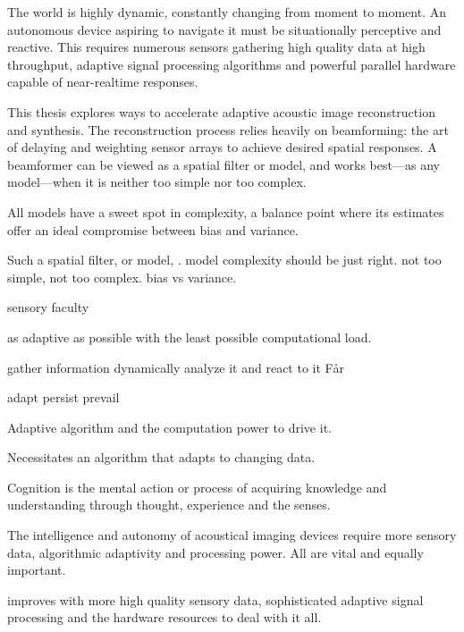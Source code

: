 
The world is highly dynamic, constantly changing from moment to moment. An autonomous device aspiring to navigate it must be situationally perceptive and reactive. This requires numerous sensors gathering high quality data at high throughput, adaptive signal processing algorithms and powerful parallel hardware capable of near-realtime responses.

This thesis explores ways to accelerate adaptive acoustic image reconstruction and synthesis. The reconstruction process relies heavily on beamforming: the art of delaying and weighting sensor arrays to achieve desired spatial responses. A beamformer can be viewed as a spatial filter or model, and works best---as any model---when it is neither too simple nor too complex. 

All models have a sweet spot in complexity, a balance point where its estimates offer an ideal compromise between bias and variance. 

Such a spatial filter, or model, . model complexity should be just right. not too simple, not too complex. bias vs variance. 



sensory faculty

as adaptive as possible with the least possible computational load.




gather information
dynamically analyze it
and react to it
Får 

adapt
persist
prevail

Adaptive algorithm and the computation power to drive it.


Necessitates an algorithm that adapts to changing data. 



Cognition is the mental action or process of acquiring knowledge and understanding through thought, experience and the senses. 

The intelligence and autonomy of acoustical imaging devices require more sensory data, algorithmic adaptivity and processing power. All are vital and equally important. 



improves with more high quality sensory data, sophisticated adaptive signal processing and the hardware resources to deal with it all. 

